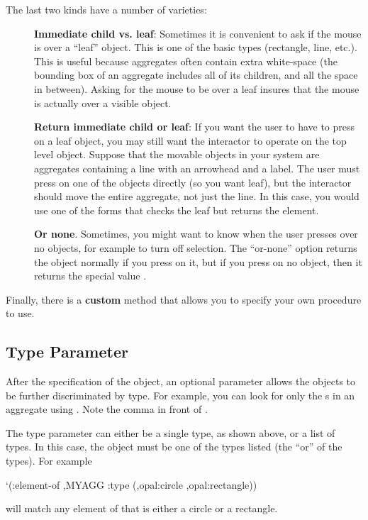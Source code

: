 The last two kinds have a number of varieties:
\begin{description}
\item[] {\bf Immediate child vs. leaf}: Sometimes it is convenient to ask if the
mouse is over a ``leaf'' object.  This is one of the basic types
(rectangle, line, etc.).  This is useful because aggregates often contain
extra white-space (the bounding box of an aggregate includes all of its
children, and all the space in between).  Asking for the mouse to be over a
leaf insures that the mouse is actually over a visible object.

\item[] {\bf Return immediate child or leaf}: If you want the user to have to press
on a leaf object, you may still want the interactor to operate on the top
level object.  Suppose that the movable objects in your system are
aggregates containing a line with an arrowhead and a label.
The user must press on one of the objects directly (so you want leaf), but
the interactor should move the entire aggregate, not just the line.  In
this case, you would use one of the forms that checks the leaf but returns
the element.

\item[] {\bf Or none}.  Sometimes, you might want to know when the user presses over
no objects, for example to turn off selection.  The ``or-none'' option
returns the object normally if you press on it, but if you press on no
object, then it returns the special value .
\end{description}

Finally, there is a {\bf custom} method that allows you to specify your own
procedure to use.

\subsection{Type Parameter}
\label{leaftype}
After the specification of the object, an optional  parameter
allows the objects to be further discriminated by type.  For example, you
can look for only the s in an aggregate using
.  Note the comma in front of
.

The type parameter can either be a single type, as shown above, or a list
of types.  In this case, the object must be one of the types listed (the
``or'' of the types).  For example
\begin{programexample}
`(:element-of ,MYAGG :type (,opal:circle ,opal:rectangle))
\end{programexample}
will match any element of  that is either a circle or a rectangle.

